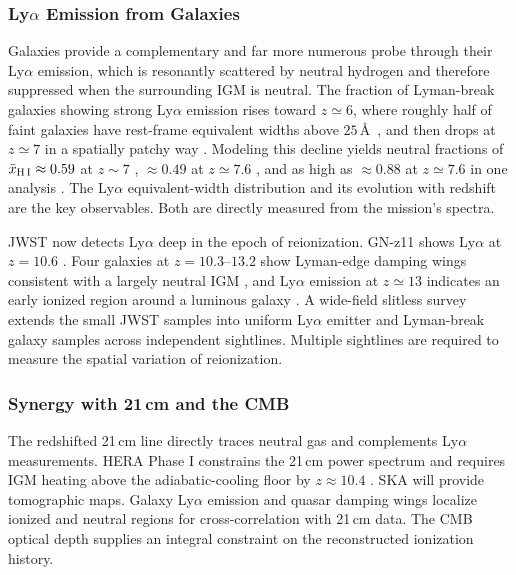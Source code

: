 \subsubsection{Ly$\alpha$ Emission from Galaxies}

Galaxies provide a complementary and far more numerous probe through their Ly$\alpha$ emission, which is resonantly scattered by neutral hydrogen and therefore suppressed when the surrounding IGM is neutral. The fraction of Lyman-break galaxies showing strong Ly$\alpha$ emission rises toward $z\simeq6$, where roughly half of faint galaxies have rest-frame equivalent widths above $25$\,\AA\ \cite{stark2010,stark2011}, and then drops at $z\simeq7$ in a spatially patchy way \cite{pentericci2014}. Modeling this decline yields neutral fractions of $\bar{x}_{\rm H\,I}\approx0.59$ at $z\sim7$ \cite{mason2018}, $\approx0.49$ at $z\simeq7.6$ \cite{jung2020}, and as high as $\approx0.88$ at $z\simeq7.6$ in one analysis \cite{hoag2019}. The Ly$\alpha$ equivalent-width distribution and its evolution with redshift are the key observables. Both are directly measured from the mission's spectra.

JWST now detects Ly$\alpha$ deep in the epoch of reionization. GN-z11 shows Ly$\alpha$ at $z=10.6$ \cite{bunker2023}. Four galaxies at $z=10.3$--$13.2$ show Lyman-edge damping wings consistent with a largely neutral IGM \cite{curtislake2023}, and Ly$\alpha$ emission at $z\simeq13$ indicates an early ionized region around a luminous galaxy \cite{witstok2025}. A wide-field slitless survey extends the small JWST samples into uniform Ly$\alpha$ emitter and Lyman-break galaxy samples across independent sightlines. Multiple sightlines are required to measure the spatial variation of reionization.

\subsubsection{Synergy with 21\,cm and the CMB}

The redshifted 21\,cm line directly traces neutral gas and complements Ly$\alpha$ measurements. HERA Phase I constrains the 21\,cm power spectrum and requires IGM heating above the adiabatic-cooling floor by $z\approx10.4$ \cite{hera2023}. SKA will provide tomographic maps. Galaxy Ly$\alpha$ emission and quasar damping wings localize ionized and neutral regions for cross-correlation with 21\,cm data. The CMB optical depth \cite{planck2018} supplies an integral constraint on the reconstructed ionization history.

